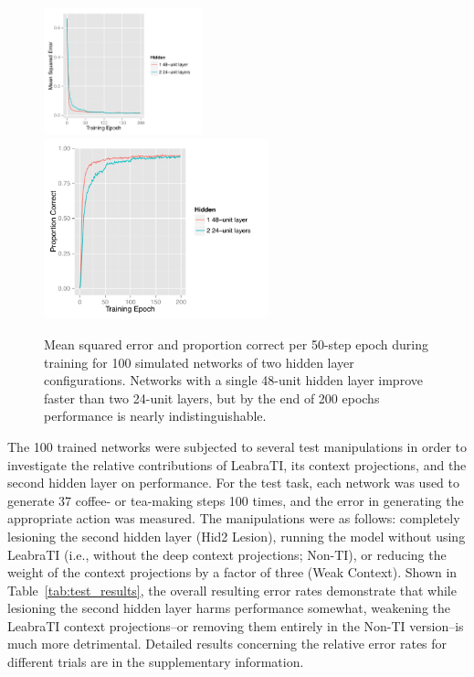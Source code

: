 \documentclass[10pt,letterpaper]{article}
\numberwithin{equation}{section}
\begin{document}
\begin{figure}
  \centering
  \includegraphics[width=0.41\textwidth]{figs/avg_norm_err_vs_epoch}
  \includegraphics[width=0.58\textwidth]{figs/perf_vs_epoch}
  \caption{Mean squared error and proportion correct per 50-step epoch during training for 100 simulated networks of two hidden layer configurations. Networks with a single 48-unit hidden layer improve faster than two 24-unit layers, but by the end of 200 epochs performance is nearly indistinguishable.}
  \label{fig:epochs}
\end{figure}

The 100 trained networks were subjected to several test manipulations in order to investigate the relative contributions of LeabraTI, its context projections, and the second hidden layer on performance. For the test task, each network was used to generate 37 coffee- or tea-making steps 100 times, and the error in generating the appropriate action was measured. The manipulations were as follows: completely lesioning the second hidden layer (Hid2 Lesion), running the model without using LeabraTI (i.e., without the deep context projections; Non-TI), or reducing the weight of the context projections by a factor of three (Weak Context). Shown in Table~\ref{tab:test_results}, the overall resulting error rates demonstrate that while lesioning the second hidden layer harms performance somewhat, weakening the LeabraTI context projections--or removing them entirely in the Non-TI version--is much more detrimental. Detailed results concerning the relative error rates for different trials are in the supplementary information.
\end{document}
